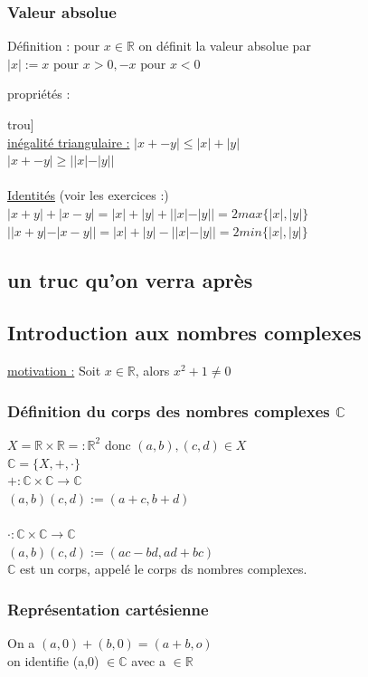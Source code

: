 \documentclass[12pt,a4paper]{article}
\newcommand{\R}{\ensuremath{\mathbb{R}} }
\newcommand{\pour}{\mbox{ pour }}
\begin{document}
\subsubsection{Valeur absolue}
\begin{boite}
Définition : pour $x \in \R$ on définit la valeur absolue par $|x| := x \pour x > 0, -x \pour x < 0$
\end{boite}

propriétés :{trou]\\
\underline{inégalité triangulaire :}
$|x+- y| \leq |x| + |y|$\\
$|x+- y| \geq ||x| - |y||$\\
\\
\underline{Identités} (voir les exercices :)\\
$|x + y| + |x-y| = |x| + |y| + ||x| - |y|| = 2max\{|x|, |y|\}$\\
$||x+y|-|x-y|| = |x|+|y|-||x|-|y|| = 2min \{|x|, |y|\}$

\subsection{un truc qu'on verra après}
\subsection{Introduction aux nombres complexes}
\underline{motivation :} Soit $x\in \R$, alors $x^2 + 1 \neq 0$
\subsubsection{Définition du corps des nombres complexes $\mathbb{C}$}
$X = \R \times \R =: \R^2$ donc $(a,b), (c,d) \in X$\\
$\mathbb{C} = \{X, +, \cdot\}$\\
$+ : \mathbb{C} \times \mathbb{C} \longrightarrow \mathbb{C}$\\
$(a,b)(c,d) := (a+c, b+d)$\\
\\
$\cdot  : \mathbb{C} \times \mathbb{C} \longrightarrow \mathbb{C}$\\
$(a,b)(c,d) := (ac-bd, ad+bc)$\\
$\mathbb{C}$ est un corps, appelé le corps ds nombres complexes.
\subsubsection{Représentation cartésienne}
On a $(a,0) + (b,0) = (a+b, o)$\\
on identifie (a,0) $\in \mathbb{C}$ avec a $\in \R$

}
\end{document}
